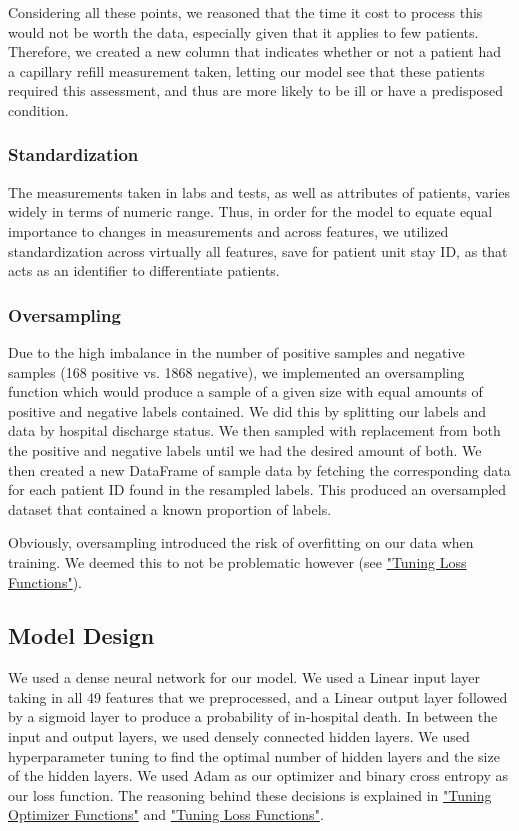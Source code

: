 \documentclass{article}
\begin{document}
Considering all these points, we reasoned that the time it cost to process this would not be worth the data, especially given that it applies to few patients. Therefore, we created a new column that indicates whether or not a patient had a capillary refill measurement taken, letting our model see that these patients required this assessment, and thus are more likely to be ill or have a predisposed condition.

\subsubsection{Standardization}

The measurements taken in labs and tests, as well as attributes of patients, varies widely in terms of numeric range. Thus, in order for the model to equate equal importance to changes in measurements and across features, we utilized standardization across virtually all features, save for patient unit stay ID, as that acts as an identifier to differentiate patients.

\subsubsection{Oversampling}
\label{sssec:ovrsmpl}
Due to the high imbalance in the number of positive samples and negative samples (168 positive vs. 1868 negative), we implemented 
an oversampling function which would produce a sample of a given size with equal amounts of positive and negative labels contained. We 
did this by splitting our labels and data by hospital discharge status. We then sampled with replacement from both the positive and 
negative labels until we had the desired amount of both. We then created a new DataFrame of sample data by fetching the corresponding data
for each patient ID found in the resampled labels. This produced an oversampled dataset that contained a known proportion of labels. 

Obviously, oversampling introduced the risk of overfitting on our data when training. We deemed this to not be problematic however (see \hyperref[sssec:loss]{"Tuning Loss Functions"}).

\subsection{Model Design}

We used a dense neural network for our model. We used a Linear input layer taking in all 49 features that we preprocessed, and a Linear 
output layer followed by a sigmoid layer to produce a probability of in-hospital death. In between the input and output layers, we used
densely connected hidden layers. We used hyperparameter tuning to find the optimal number of hidden layers and the size of the hidden layers. We used Adam as our optimizer and binary cross entropy as our loss function. The reasoning behind these decisions is explained
in \hyperref[sssec:optim]{"Tuning Optimizer Functions"} and \hyperref[sssec:loss]{"Tuning Loss Functions"}.
\end{document}
